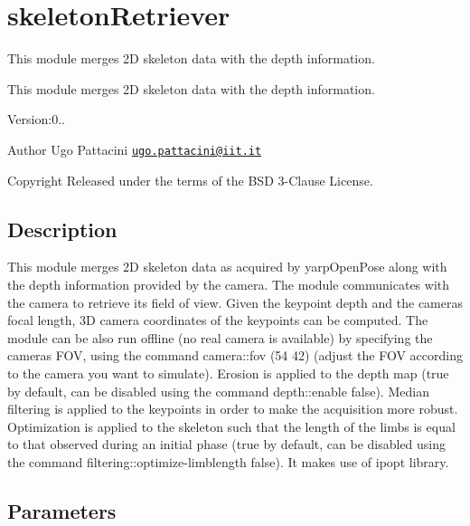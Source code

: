 \section{skeleton\+Retriever}
\label{group__skeletonRetriever}


This module merges 2D skeleton data with the depth information.  


This module merges 2D skeleton data with the depth information. 

Version\+:0.. \begin{DoxyAuthor}{Author}
Ugo Pattacini \href{mailto:ugo.pattacini@iit.it}{\tt ugo.\+pattacini@iit.\+it} ~\newline
 
\end{DoxyAuthor}
\begin{DoxyCopyright}{Copyright}
Released under the terms of the B\+SD 3-\/\+Clause License. 
\end{DoxyCopyright}
\hypertarget{group__skeletonViewer_intro_sec}{}\subsection{Description}\label{group__skeletonViewer_intro_sec}
This module merges 2D skeleton data as acquired by yarp\+Open\+Pose along with the depth information provided by the camera. The module communicates with the camera to retrieve its field of view. Given the keypoint depth and the camera\textquotesingle{}s focal length, 3D camera coordinates of the keypoints can be computed. The module can be also run offline (no real camera is available) by specifying the camera\textquotesingle{}s F\+OV, using the command camera\+::fov (54 42) (adjust the F\+OV according to the camera you want to simulate). Erosion is applied to the depth map (true by default, can be disabled using the command depth\+::enable false). Median filtering is applied to the keypoints in order to make the acquisition more robust. Optimization is applied to the skeleton such that the length of the limbs is equal to that observed during an initial phase (true by default, can be disabled using the command filtering\+::optimize-\/limblength false). It makes use of ipopt library.\hypertarget{group__skeletonViewer_parameters_sec}{}\subsection{Parameters}\label{group__skeletonViewer_parameters_sec}

